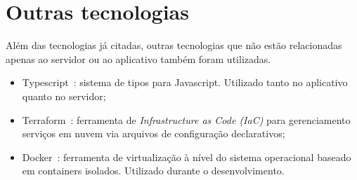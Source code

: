 \FloatBarrier

\section{Outras tecnologias}

Além das tecnologias já citadas, outras tecnologias que não estão relacionadas apenas ao servidor ou ao aplicativo também foram utilizadas.

\begin{itemize}
	\item Typescript~\cite{typescript}: sistema de tipos para Javascript. Utilizado tanto  no aplicativo quanto no servidor;
	\item Terraform~\cite{terraform}: ferramenta de \emph{Infrastructure as Code (IaC)} para gerenciamento serviços em nuvem via arquivos de configuração declarativos;
	\item Docker~\cite{docker}: ferramenta de virtualização à nível do sistema operacional baseado em containers isolados. Utilizado durante o desenvolvimento.
\end{itemize}
